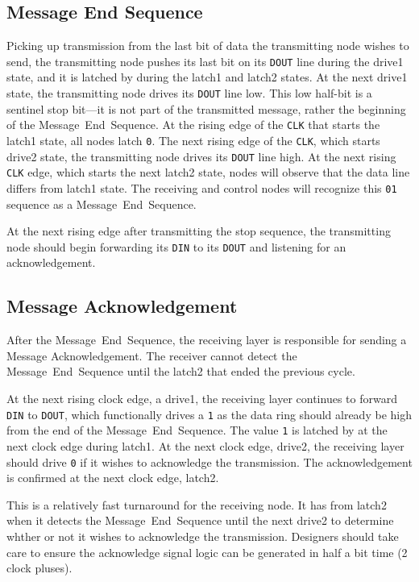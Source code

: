 \subsection{Message End Sequence}
\label{sec:protocol-end}
Picking up transmission from the last bit of data the transmitting node wishes
to send, the transmitting node pushes its last bit on its {\tt DOUT} line
during the {\sc drive1} state, and it is latched by \bus during the {\sc
latch1} and {\sc latch2} states.  At the next {\sc drive1} state, the 
transmitting node drives its {\tt DOUT} line low. This low half-bit is a sentinel 
stop bit---it is not part of the transmitted message, rather the beginning of 
the Message~End~Sequence. At the rising edge of the {\tt CLK} that starts the
{\sc latch1} state, all \bus nodes latch {\tt 0}. The next rising edge of the
{\tt CLK}, which starts {\sc drive2} state, the transmitting node drives its 
{\tt DOUT} line high. At the next rising {\tt CLK} edge, which starts the next 
{\sc latch2} state, nodes will observe that the data line differs from 
{\sc latch1} state. The receiving and control nodes will recognize this
{\tt 01} sequence as a Message~End~Sequence.

At the next rising edge after transmitting the stop sequence, the transmitting
node should begin forwarding its {\tt DIN} to its {\tt DOUT} and listening for
an acknowledgement.

\subsection{Message Acknowledgement}
\label{sec:protocol-ack}
After the Message~End~Sequence, the receiving layer is responsible for sending a
Message Acknowledgement. The receiver cannot detect the Message~End~Sequence
until the {\sc latch2} that ended the previous cycle.

At the next rising clock edge, a {\sc drive1}, the receiving layer continues
to forward {\tt DIN} to {\tt DOUT}, which functionally drives a {\tt 1} as the
data ring should already be high from the end of the Message~End~Sequence. The
value {\tt 1} is latched by \bus at the next clock edge during {\sc latch1}.
At the next clock edge, {\sc drive2}, the receiving layer should drive {\tt 0}
if it wishes to acknowledge the transmission. The acknowledgement is confirmed
at the next clock edge, {\sc latch2}.

This is a relatively fast turnaround for the receiving node. It has from {\sc
latch2} when it detects the Message~End~Sequence until the next {\sc drive2} to
determine whther or not it wishes to acknowledge the transmission. Designers
should take care to ensure the acknowledge signal logic can be generated in
half a bit time (2 clock pluses).


